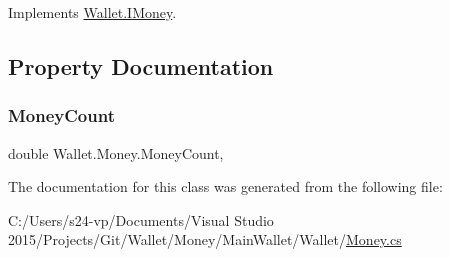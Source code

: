 Implements \hyperlink{interface_wallet_1_1_i_money_a73409586903369db2c15c60623731834}{Wallet.\+I\+Money}.



\subsection{Property Documentation}
\hypertarget{class_wallet_1_1_money_ae34a6f4e26bbd7b3ff5fdf88f1c0c83f}{}\label{class_wallet_1_1_money_ae34a6f4e26bbd7b3ff5fdf88f1c0c83f} 
\subsubsection{\texorpdfstring{Money\+Count}{MoneyCount}}
{\footnotesize\ttfamily double Wallet.\+Money.\+Money\+Count\hspace{0.3cm}{\ttfamily [get]}, {\ttfamily [set]}}



The documentation for this class was generated from the following file\+:\begin{DoxyCompactItemize}
\item 
C\+:/\+Users/s24-\/vp/\+Documents/\+Visual Studio 2015/\+Projects/\+Git/\+Wallet/\+Money/\+Main\+Wallet/\+Wallet/\hyperlink{_money_8cs}{Money.\+cs}\end{DoxyCompactItemize}
